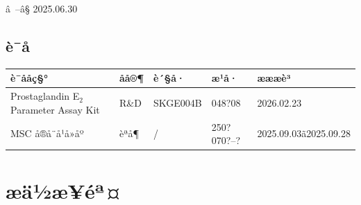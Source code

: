 \documentclass[UTF8,10pt,a4paper,fontset=fandol]{ctexart}
\newcommand{\fieldvalue}[1]{#1}
\newcommand{\handwritten}[1]{#1}
\begin{document}
\handwritten{â --â§}
\handwritten{2025.06.30}

\subsection{è¯å}

\begin{tabularx}{\textwidth}{|X|l|l|l|l|}
\hline
è¯ååç§° & åå®¶ & è´§å· & æ¹å· & æææè³ \\
\hline
Prostaglandin E$_2$ Parameter Assay Kit & R\&D & SKGE004B &
\fieldvalue{\handwritten{048?08}} &
\fieldvalue{\handwritten{2026.02.23}}
\\ \hline
MSC å®å¨å¹å»åº & èªå¶ & / &
\fieldvalue{\handwritten{250?070?--?}} &
\fieldvalue{\handwritten{2025.09.03ã2025.09.28}}
\\ \hline
\end{tabularx}

\section{æä½æ­¥éª¤}
\end{document}
